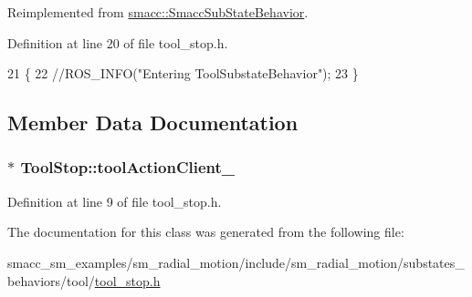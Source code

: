 Reimplemented from \hyperlink{classsmacc_1_1SmaccSubStateBehavior_a1f87ab55c1805b2a2fd9c022807d35b9}{smacc\+::\+Smacc\+Sub\+State\+Behavior}.



Definition at line 20 of file tool\+\_\+stop.\+h.


\begin{DoxyCode}
21     \{
22       \textcolor{comment}{//ROS\_INFO("Entering ToolSubstateBehavior");}
23     \}
\end{DoxyCode}


\subsection{Member Data Documentation}
\subsubsection[{\texorpdfstring{tool\+Action\+Client\+\_\+}{toolActionClient_}}]{$\ast$ Tool\+Stop\+::tool\+Action\+Client\+\_\+}\hypertarget{classToolStop_ae8ebe607606d235b52317e9a0f570e31}{}\label{classToolStop_ae8ebe607606d235b52317e9a0f570e31}


Definition at line 9 of file tool\+\_\+stop.\+h.



The documentation for this class was generated from the following file\+:\begin{DoxyCompactItemize}
\item 
smacc\+\_\+sm\+\_\+examples/sm\+\_\+radial\+\_\+motion/include/sm\+\_\+radial\+\_\+motion/substates\+\_\+behaviors/tool/\hyperlink{tool__stop_8h}{tool\+\_\+stop.\+h}\end{DoxyCompactItemize}
